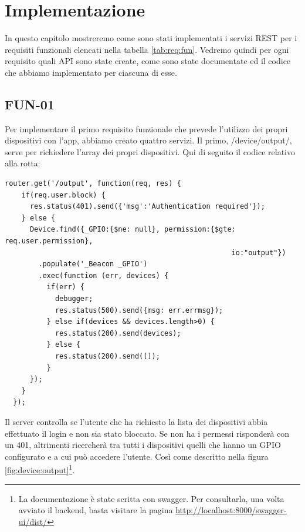 \chapter{Implementazione}
In questo capitolo mostreremo come sono stati implementati i servizi REST per i requisiti funzionali elencati nella tabella \ref{tab:req:fun}.
Vedremo quindi per ogni requisito quali API sono state create, come sono state documentate ed il codice che abbiamo implementato per ciascuna di esse.

\section{FUN-01}
Per implementare il primo requisito funzionale che prevede l'utilizzo dei propri dispositivi con l'app, abbiamo creato quattro servizi.
Il primo, /device/output/, serve per richiedere l'array dei propri dispositivi.
Qui di seguito il codice relativo alla rotta:
\begin{lstlisting}[caption={/webserver/app/routes/device.js output}, style=javaScriptCode]
  router.get('/output', function(req, res) {
    if(req.user.block) {
      res.status(401).send({'msg':'Authentication required'});
    } else {
      Device.find({_GPIO:{$ne: null}, permission:{$gte: req.user.permission}, 
                                                      io:"output"})
        .populate('_Beacon _GPIO')
        .exec(function (err, devices) {
          if(err) {
            debugger;
            res.status(500).send({msg: err.errmsg});
          } else if(devices && devices.length>0) {
            res.status(200).send(devices);
          } else {
            res.status(200).send([]);
          }
      });
    }
  });
\end{lstlisting}
Il server controlla se l'utente che ha richiesto la lista dei dispositivi abbia effettuato il login e non sia stato bloccato.
Se non ha i permessi risponderà con un 401, altrimenti ricercherà tra tutti i dispositivi quelli che hanno un GPIO configurato e a cui può accedere l'utente. 
Così come descritto nella figura \ref{fig:device:output}\footnote{La documentazione è state scritta con swagger. Per consultarla, una volta avviato il backend, basta visitare la pagina \url{http://localhost:8000/swagger-ui/dist/} }. 

